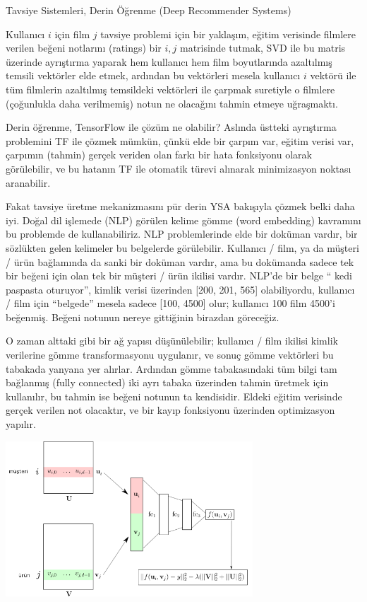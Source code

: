 \documentclass[12pt,fleqn]{article}\usepackage{../../common}
\begin{document}
Tavsiye Sistemleri, Derin Öğrenme (Deep Recommender Systems)

Kullanıcı $i$ için film $j$ tavsiye problemi için bir yaklaşım, eğitim
verisinde filmlere verilen beğeni notlarını (ratings) bir $i,j$ matrisinde
tutmak, SVD ile bu matris üzerinde ayrıştırma yaparak hem kullanıcı hem
film boyutlarında azaltılmış temsili vektörler elde etmek, ardından bu
vektörleri mesela kullanıcı $i$ vektörü ile tüm filmlerin azaltılmış
temsildeki vektörleri ile çarpmak suretiyle o filmlere (çoğunlukla daha
verilmemiş) notun ne olacağını tahmin etmeye uğraşmaktı.

Derin öğrenme, TensorFlow ile çözüm ne olabilir?  Aslında üstteki
ayrıştırma problemini TF ile çözmek mümkün, çünkü elde bir çarpım var,
eğitim verisi var, çarpımın (tahmin) gerçek veriden olan farkı bir hata
fonksiyonu olarak görülebilir, ve bu hatanın TF ile otomatik türevi
alınarak minimizasyon noktası aranabilir.

Fakat tavsiye üretme mekanizmasını pür derin YSA bakışıyla çözmek belki
daha iyi. Doğal dil işlemede (NLP) görülen kelime gömme (word embedding)
kavramını bu problemde de kullanabiliriz. NLP problemlerinde elde bir
doküman vardır, bir sözlükten gelen kelimeler bu belgelerde
görülebilir. Kullanıcı / film, ya da müşteri / ürün bağlamında da sanki bir
doküman vardır, ama bu dokümanda sadece tek bir beğeni için olan tek bir
müşteri / ürün ikilisi vardır. NLP'de bir belge `` kedi paspasta
oturuyor'', kimlik verisi üzerinden [200, 201, 565] olabiliyordu, kullanıcı
/ film için ``belgede'' mesela sadece [100, 4500] olur; kullanıcı 100 film
4500'i beğenmiş. Beğeni notunun nereye gittiğinin birazdan göreceğiz.

O zaman alttaki gibi bir ağ yapısı düşünülebilir; kullanıcı / film ikilisi
kimlik verilerine gömme transformasyonu uygulanır, ve sonuç gömme
vektörleri bu tabakada yanyana yer alırlar. Ardından gömme tabakasındaki
tüm bilgi tam bağlanmış (fully connected) iki ayrı tabaka üzerinden tahmin
üretmek için kullanılır, bu tahmin ise beğeni notunun ta kendisidir. Eldeki
eğitim verisinde gerçek verilen not olacaktır, ve bir kayıp fonksiyonu
üzerinden optimizasyon yapılır.

\includegraphics[width=25em]{recom_01.png}
\end{document}
